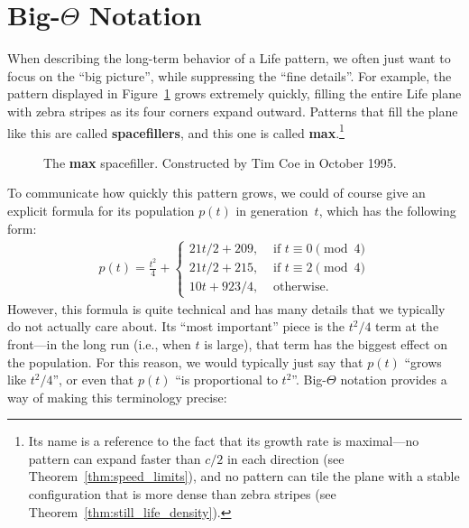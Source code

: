\clearpage


\section{Big-\texorpdfstring{$\Theta$}{Theta} Notation}\label{sec:bigO}

When describing the long-term behavior of a Life pattern, we often just want to focus on the ``big picture'', while suppressing the ``fine details''. For example, the pattern displayed in Figure~\ref{fig:max} grows extremely quickly, filling the entire Life plane with zebra stripes as its four corners expand outward. Patterns that fill the plane like this are called \textbf{spacefillers}, and this one is called \textbf{max}.\footnote{Its name is a reference to the fact that its growth rate is maximal---no pattern can expand faster than $c/2$ in each direction (see Theorem~\ref{thm:speed_limits}), and no pattern can tile the plane with a stable configuration that is more dense than zebra stripes (see Theorem~\ref{thm:still_life_density}).}

\begin{figure}[!htb]
	\centering
	\caption{The \textbf{max} spacefiller. Constructed by Tim Coe in October 1995.}\label{fig:max}
\end{figure}

To communicate how quickly this pattern grows, we could of course give an explicit formula for its population $p(t)$ in generation~$t$, which has the following form:
\begin{align}\label{eq:max_population_formula}
	p(t) = \frac{t^2}{4} + \begin{cases}
		21t/2 + 209, & \text{ if } t \equiv 0 \pmod{4} \\
		21t/2 + 215, & \text{ if } t \equiv 2 \pmod{4} \\
		10t + 923/4, & \text{ otherwise}.
	\end{cases}
\end{align}
However, this formula is quite technical and has many details that we typically do not actually care about. Its ``most important'' piece is the $t^2/4$ term at the front---in the long run (i.e., when $t$ is large), that term has the biggest effect on the population. For this reason, we would typically just say that $p(t)$ ``grows like $t^2/4$'', or even that $p(t)$ ``is proportional to $t^2$''. Big-$\Theta$ notation provides a way of making this terminology precise:

